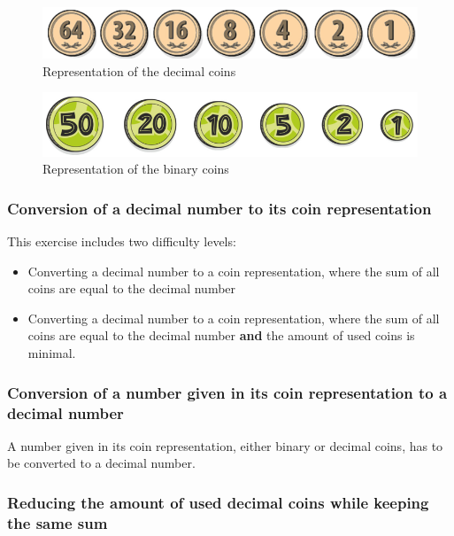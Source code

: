 \begin{figure} 
    \centering
    \includegraphics[width=0.5 \columnwidth]{figures/decimal_coins.png}
    \caption{Representation of the decimal coins} 
    \label{fig:decimal_coins} 
\end{figure}

\begin{figure} 
    \centering
    \includegraphics[width=0.5 \columnwidth]{figures/binary_coins.png}
    \caption{Representation of the binary coins} 
    \label{fig:binary_coins} 
\end{figure}

\subsubsection*{Conversion of a decimal number to its coin representation}

This exercise includes two difficulty levels:

\begin{itemize}
    \item Converting a decimal number to a coin representation, where the sum of all coins are equal to the decimal number
    \item Converting a decimal number to a coin representation, where the sum of all coins are equal to the decimal number \textbf{and} the amount of used coins is minimal.
\end{itemize}

\subsubsection*{Conversion of a number given in its coin representation to a decimal number}

A number given in its coin representation, either binary or decimal coins, has to be converted to a decimal number. 

\subsubsection*{Reducing the amount of used decimal coins while keeping the same sum}


